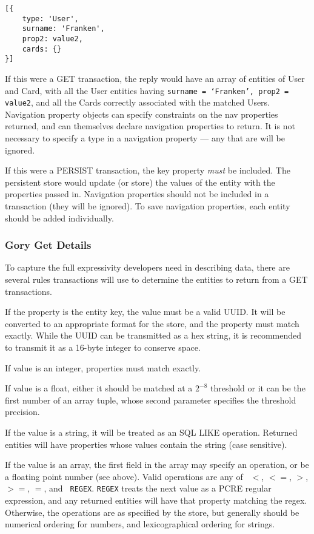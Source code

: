 \documentclass{article}
\newcommand{\ilcode}{\tt}
\begin{document}
\linespread{1}
\begin{lstlisting}
[{
	type: 'User',
	surname: 'Franken',
	prop2: value2,
	cards: {}
}]
\end{lstlisting}
\linespread{1.6}

If this were a GET transaction, the reply would have an array of entities of
User and Card, with all the User entities having {\ilcode surname = `Franken',
prop2 = value2}, and all the Cards correctly associated with the matched Users.
Navigation property objects can specify constraints on the nav properties
returned, and can themselves declare navigation properties to return. It is not
necessary to specify a type in a navigation property --- any that are will be
ignored.

If this were a PERSIST transaction, the key property {\it must} be included. The
persistent store would update (or store) the values of the entity with the
properties passed in. Navigation properties should not be included in a
transaction (they will be ignored). To save navigation properties, each entity
should be added individually.

\subsubsection{Gory Get Details}
To capture the full expressivity developers need in describing data, there are
several rules transactions will use to determine the entities to return from a
GET transactions.

If the property is the entity key, the value must be a valid UUID. It will be
converted to an appropriate format for the store, and the property must match
exactly. While the UUID can be transmitted as a hex string, it is recommended to
transmit it as a 16-byte integer to conserve space.

If value is an integer, properties must match exactly.

If value is a float, either it should be matched at a $2^{-8}$ threshold or it
can be the first number of an array tuple, whose second parameter specifies the
threshold precision.

If the value is a string, it will be treated as an SQL LIKE operation.
Returned entities will have properties whose values contain the string (case
sensitive).

If the value is an array, the first field in the array may specify an operation,
or be a floating point number (see above). Valid operations are any of {\ilcode
$<$}, {\ilcode $<=$}, {\ilcode $>$}, {\ilcode $>=$}, {\ilcode $=$}, and {\ilcode
REGEX}. {\ilcode REGEX} treats the next value as a PCRE regular expression, and
any returned entities will have that property matching the regex. Otherwise, the
operations are as specified by the store, but generally should be numerical
ordering for numbers, and lexicographical ordering for strings.
\end{document}
